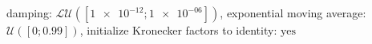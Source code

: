 damping: $\mathcal{LU}([\num[scientific-notation=true]{1e-12}; \num[scientific-notation=true]{1e-06}])$, exponential moving average: $\mathcal{U}([0; \num[scientific-notation=true]{0.99}])$, initialize Kronecker factors to identity: $\text{yes}$